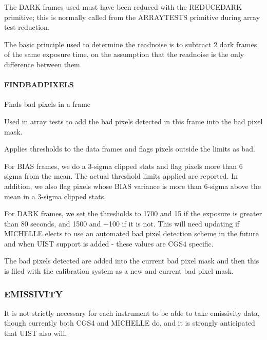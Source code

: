 \documentclass[twoside,11pt]{article}
\renewcommand{\_}{\texttt{\symbol{95}}}
\begin{document}
The DARK frames used must have been reduced with the \_REDUCE\_DARK\_
primitive; this is normally called from the \_ARRAY\_TESTS\_ primitive
during array test reduction.



The basic principle used to determine the readnoise is to subtract 2
dark frames of the same exposure time, on the assumption that the
readnoise is the only difference between them.


\paragraph{\_FIND\_BAD\_PIXELS\_\label{_FIND_BAD_PIXELS_}}

Finds bad pixels in a frame


\mbox{}

Used in array tests to add the bad pixels detected in this frame into the 
bad pixel mask.



Applies thresholds to the data frames and flags pixels outside
the limits as bad.



For BIAS frames, we do a 3-sigma clipped stats and flag pixels more
than 6 sigma from the mean. The actual threshold limits applied are
reported. In addition, we also flag pixels whose BIAS variance is more
than 6-sigma above the mean in a 3-sigma clipped stats.



For DARK frames, we set the thresholds to 1700 and 15 if the exposure
is greater than 80 seconds, and 1500 and $-$100 if it is not. This will
need updating if MICHELLE elects to use an automated bad pixel
detection scheme in the future and when UIST support is added - these
values are CGS4 specific.



The bad pixels detected are added into the current bad pixel mask and
then this is filed with the calibration system as a new and current
bad pixel mask.


\subsubsection{EMISSIVITY}

It is not strictly necessary for each instrument to be able to take
emissivity data, though currently both CGS4 and MICHELLE do, and it is
strongly anticipated that UIST also will.
\end{document}
